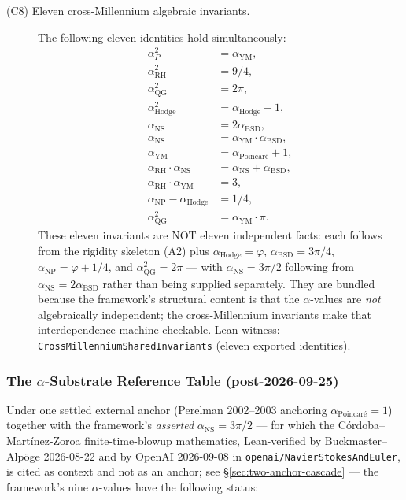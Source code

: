 \begin{description}
\item[\textnormal{(C8) Eleven cross-Millennium algebraic invariants.}]
The following eleven identities hold simultaneously:
\begin{align}
\alpha_P^2 &= \alpha_{\text{YM}}, \\
\alpha_{\text{RH}}^2 &= 9/4, \\
\alpha_{\text{QG}}^2 &= 2\pi, \\
\alpha_{\text{Hodge}}^2 &= \alpha_{\text{Hodge}} + 1, \\
\alpha_{\text{NS}} &= 2 \alpha_{\text{BSD}}, \\
\alpha_{\text{NS}} &= \alpha_{\text{YM}} \cdot \alpha_{\text{BSD}}, \\
\alpha_{\text{YM}} &= \alpha_{\text{Poincar\'e}} + 1, \\
\alpha_{\text{RH}} \cdot \alpha_{\text{NS}} &= \alpha_{\text{NS}} + \alpha_{\text{BSD}}, \\
\alpha_{\text{RH}} \cdot \alpha_{\text{YM}} &= 3, \\
\alpha_{\text{NP}} - \alpha_{\text{Hodge}} &= 1/4, \\
\alpha_{\text{QG}}^2 &= \alpha_{\text{YM}} \cdot \pi.
\end{align}
These eleven invariants are NOT eleven independent facts: each
follows from the rigidity skeleton (A2) plus
$\alpha_{\text{Hodge}} = \varphi$, $\alpha_{\text{BSD}} = 3\pi/4$,
$\alpha_{\text{NP}} = \varphi + 1/4$,
and $\alpha_{\text{QG}}^2 = 2\pi$ --- with
$\alpha_{\text{NS}} = 3\pi/2$ following from
$\alpha_{\text{NS}} = 2\alpha_{\text{BSD}}$ rather than being supplied
separately.%
 They are bundled
because the framework's structural content is that the
$\alpha$-values are \emph{not} algebraically independent; the
cross-Millennium invariants make that interdependence
machine-checkable. Lean witness:
\texttt{Cross\allowbreak{}Millennium\allowbreak{}Shared\allowbreak{}Invariants} (eleven exported
identities).
\end{description}

\subsubsection*{The $\alpha$-Substrate Reference Table (post-2026-09-25)}
\label{subsubsec:alpha-substrate-reference-table}

Under one settled external anchor (Perelman 2002--2003 anchoring
$\alpha_{\text{Poincar\'e}} = 1$) together with the framework's
\emph{asserted} $\alpha_{\text{NS}} = 3\pi/2$ --- for which the
C\'ordoba--Mart\'inez-Zoroa finite-time-blowup mathematics, Lean-verified by
Buckmaster--Alp\"oge 2026-08-22 and by OpenAI 2026-09-08 in
\texttt{openai/NavierStokesAndEuler}, is cited as context and not as an anchor;
see \S\ref{sec:two-anchor-cascade} --- the framework's nine $\alpha$-values
have the following status:

